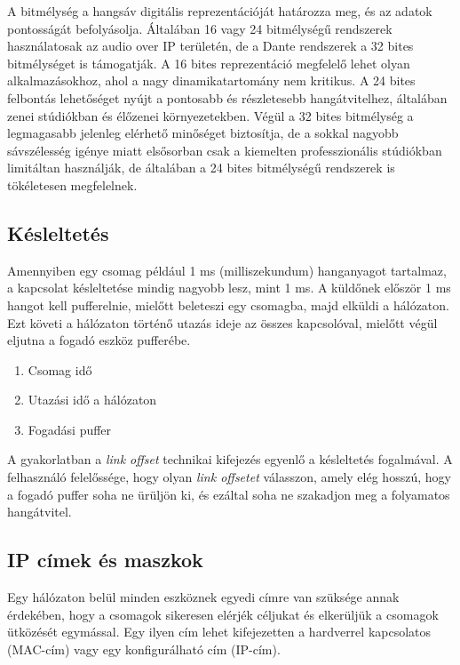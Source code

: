 A bitmélység a hangsáv digitális reprezentációját határozza meg, és az adatok pontosságát befolyásolja.
Általában 16 vagy 24 bitmélységű rendszerek használatosak az audio over IP területén, de a Dante rendszerek a 
32 bites bitmélységet is támogatják. A 16 bites reprezentáció megfelelő lehet olyan alkalmazásokhoz, ahol a nagy
dinamikatartomány nem kritikus. A 24 bites felbontás lehetőséget nyújt a pontosabb és részletesebb hangátvitelhez,
általában zenei stúdiókban és élőzenei környezetekben. 
Végül a 32 bites bitmélység a legmagasabb jelenleg elérhető minőséget biztosítja, de a sokkal nagyobb sávszélesség igénye miatt elsősorban csak
a kiemelten professzionális stúdiókban limitáltan használják, de általában a 24 bites bitmélységű rendszerek is tökéletesen megfelelnek.
\subsection{Késleltetés}
Amennyiben egy csomag például 1 ms (milliszekundum) hanganyagot tartalmaz, a kapcsolat
késleltetése mindig nagyobb lesz, mint 1 ms.
A küldőnek először 1 ms hangot kell pufferelnie, mielőtt beleteszi egy csomagba, majd elküldi a hálózaton.
Ezt követi a hálózaton történő utazás ideje az összes kapcsolóval, mielőtt végül eljutna a fogadó eszköz pufferébe.
\begin{enumerate}
    \item Csomag idő
    \item Utazási idő a hálózaton
    \item Fogadási puffer
\end{enumerate}
A gyakorlatban a \textit{link offset} technikai kifejezés egyenlő a késleltetés fogalmával.
A felhasználó felelőssége, hogy olyan \textit{link offsetet} válasszon, amely elég hosszú, hogy a fogadó puffer soha ne ürüljön ki, és
ezáltal soha ne szakadjon meg a folyamatos hangátvitel. 
\subsection{IP címek és maszkok}
Egy hálózaton belül minden eszköznek egyedi címre van szüksége annak érdekében,
hogy a csomagok sikeresen elérjék céljukat és elkerüljük a csomagok ütközését egymással.
Egy ilyen cím lehet kifejezetten a hardverrel kapcsolatos (MAC-cím) vagy egy konfigurálható cím (IP-cím).
